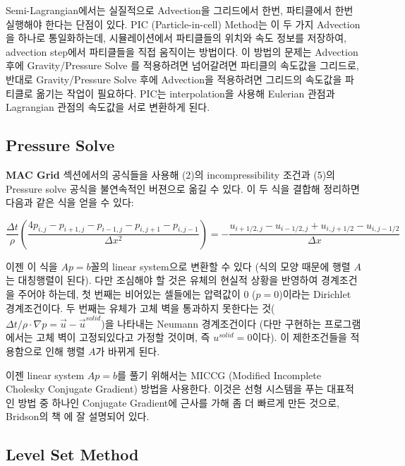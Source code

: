 \documentclass[12pt, A4]{article}
\begin{document}
Semi-Lagrangian에서는 실질적으로 Advection을 그리드에서 한번, 파티클에서 한번 실행해야 한다는 단점이 있다. PIC (Particle-in-cell) Method는 이 두 가지 Advection을 하나로 통일화하는데, 시뮬레이션에서 파티클들의 위치와 속도 정보를 저장하여, advection step에서 파티클들을 직접 움직이는 방법이다. 이 방법의 문제는 Advection 후에 Gravity/Pressure Solve 를 적용하려면 넘어갈려면 파티클의 속도값을 그리드로, 반대로 Gravity/Pressure Solve 후에 Advection을 적용하려면 그리드의 속도값을 파티클로 옮기는 작업이 필요하다. PIC는 interpolation을 사용해 Eulerian 관점과 Lagrangian 관점의 속도값을 서로 변환하게 된다. 

\subsection{Pressure Solve}

\textbf{MAC Grid} 섹션에서의 공식들을 사용해 (2)의 incompressibility 조건과 (5)의 Pressure solve 공식을 불연속적인 버젼으로 옮길 수 있다. 이 두 식을 결합해 정리하면 다음과 같은 식을 얻을 수 있다:

\begin{equation}
  \frac{\Delta t}{\rho} (\frac{4p_{i,j} - p_{i+1,j} - p_{i-1,j} - p_{i,j+1} - p_{i,j-1}}{\Delta x^2}) = -\frac{u_{i+1/2,j} - u_{i-1/2,j} + u_{i,j+1/2} - u_{i,j-1/2}}{\Delta x}
\end{equation}

이젠 이 식을 $Ap = b$꼴의 linear system으로 변환할 수 있다 (식의 모양 때문에 행렬 $A$는 대칭행렬이 된다). 다만 조심해야 할 것은 유체의 현실적 상황을 반영하여 경계조건을 주어야 하는데, 첫 번째는 비어있는 셀들에는 압력값이 0 ($p = 0$)이라는 Dirichlet 경계조건이다. 두 번째는 유체가 고체 벽을 통과하지 못한다는 것($\Delta t / \rho \cdot \nabla p = \vec{u} - \vec{u}^{solid}$)을 나타내는 Neumann 경계조건이다 \cite[p. 69-70]{fluid-sim-cg} (다만 구현하는 프로그램에서는 고체 벽이 고정되있다고 가정할 것이며, 즉 $u^{solid} = 0$이다). 이 제한조건들을 적용함으로 인해 행렬 $A$가 바뀌게 된다.

이젠 linear system $Ap = b$를 풀기 위해서는 MICCG (Modified Incomplete Cholesky Conjugate Gradient) 방법을 사용한다. 이것은 선형 시스템을 푸는 대표적인 방법 중 하나인 Conjugate Gradient에 근사를 가해 좀 더 빠르게 만든 것으로, Bridson의 책 \cite[p.79]{fluid-sim-cg}에 잘 설명되어 있다.

\subsection{Level Set Method}
\end{document}
